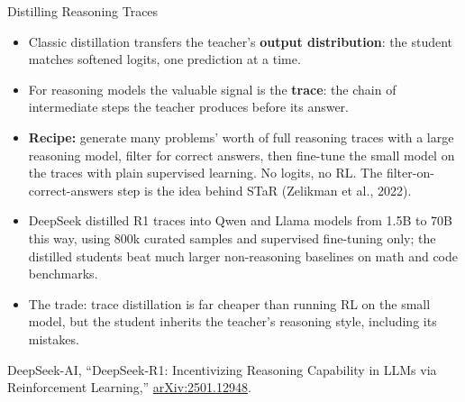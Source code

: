 \begin{frame}{Distilling Reasoning Traces}
  \begin{itemize}\footnotesize\itemsep0.45em
    \item Classic distillation transfers the teacher's \textbf{output distribution}: the student matches softened logits, one prediction at a time.
    \item For reasoning models the valuable signal is the \textbf{trace}: the chain of intermediate steps the teacher produces before its answer.
    \item \textbf{Recipe:} generate many problems' worth of full reasoning traces with a large reasoning model, filter for correct answers, then fine-tune the small model on the traces with plain supervised learning. No logits, no RL. The filter-on-correct-answers step is the idea behind STaR (Zelikman et al., 2022).
    \item DeepSeek distilled R1 traces into Qwen and Llama models from 1.5B to 70B this way, using 800k curated samples and supervised fine-tuning only; the distilled students beat much larger non-reasoning baselines on math and code benchmarks.
    \item The trade: trace distillation is far cheaper than running RL on the small model, but the student inherits the teacher's reasoning style, including its mistakes.
  \end{itemize}
  \vspace{0.2em}
  {\scriptsize DeepSeek-AI, ``DeepSeek-R1: Incentivizing Reasoning Capability in LLMs via Reinforcement Learning,'' \href{https://arxiv.org/abs/2501.12948}{arXiv:2501.12948}.}
\end{frame}
